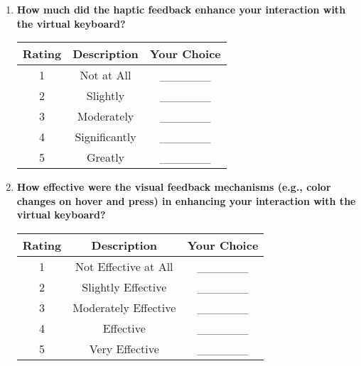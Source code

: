 \documentclass[12pt]{article}
\begin{document}
\begin{enumerate}
    \item \textbf{How much did the haptic feedback enhance your interaction with the virtual keyboard?}
    \begin{table}[h!]
        \centering
        \begin{tabular}{|c|c|c|}
            \hline
            \textbf{Rating} & \textbf{Description} & \textbf{Your Choice} \\
            \hline
            1 & Not at All & \_\_\_\_\_\_ \\
            \hline
            2 & Slightly & \_\_\_\_\_\_ \\
            \hline
            3 & Moderately & \_\_\_\_\_\_ \\
            \hline
            4 & Significantly & \_\_\_\_\_\_ \\
            \hline
            5 & Greatly & \_\_\_\_\_\_ \\
            \hline
        \end{tabular}
    \end{table}
\clearpage
    \item \textbf{How effective were the visual feedback mechanisms (e.g., color changes on hover and press) in enhancing your interaction with the virtual keyboard?}
    \begin{table}[h!]
        \centering
        \begin{tabular}{|c|c|c|}
            \hline
            \textbf{Rating} & \textbf{Description} & \textbf{Your Choice} \\
            \hline
            1 & Not Effective at All & \_\_\_\_\_\_ \\
            \hline
            2 & Slightly Effective & \_\_\_\_\_\_ \\
            \hline
            3 & Moderately Effective & \_\_\_\_\_\_ \\
            \hline
            4 & Effective & \_\_\_\_\_\_ \\
            \hline
            5 & Very Effective & \_\_\_\_\_\_ \\
            \hline
        \end{tabular}
    \end{table}
    

\end{enumerate}
\end{document}
